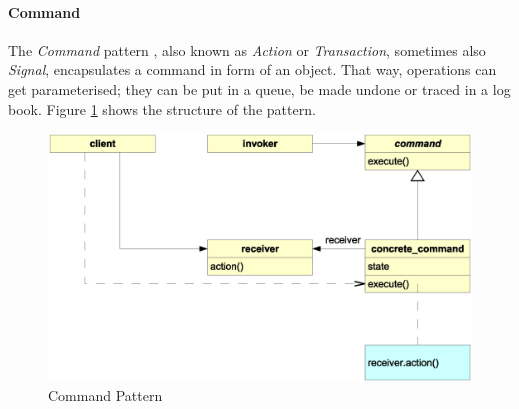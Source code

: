 %
%
%
%
%
%
%

\paragraph{Command}
\label{command_heading}

The \emph{Command} pattern \cite{gamma1995}, also known as \emph{Action} or
\emph{Transaction}, sometimes also \emph{Signal}, encapsulates a command in
form of an object. That way, operations can get parameterised; they can be put
in a queue, be made undone or traced in a log book. Figure \ref{command_figure}
shows the structure of the pattern.

\begin{figure}[ht]
    \begin{center}
        \includegraphics[scale=0.3]{vector/command.eps}
        \caption{Command Pattern}
        \label{command_figure}
    \end{center}
\end{figure}
